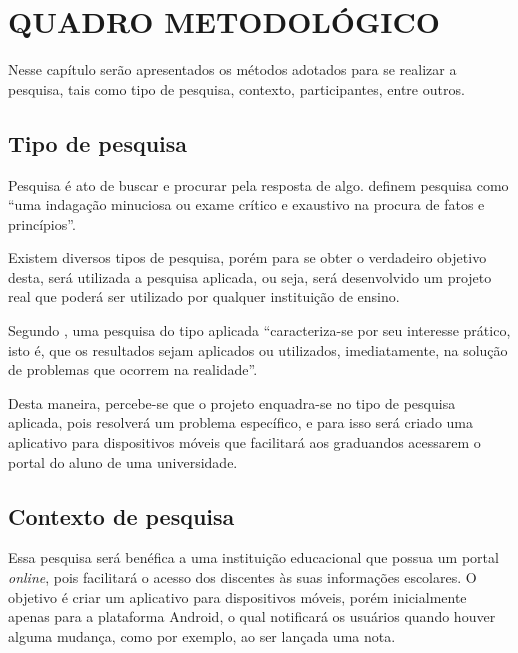 \chapter{QUADRO METODOLÓGICO}

	\par Nesse capítulo serão apresentados os métodos adotados para se realizar a
pesquisa, tais como tipo de pesquisa, contexto, participantes, entre outros.

\section{Tipo de pesquisa}

	\par Pesquisa é ato de buscar e procurar pela resposta de algo.
 definem pesquisa como “uma indagação minuciosa
ou exame crítico e exaustivo na procura de fatos e princípios”.

	\par Existem diversos tipos de pesquisa, porém para se obter o verdadeiro
objetivo desta, será utilizada a pesquisa aplicada, ou seja, será desenvolvido
um projeto real que poderá ser utilizado por qualquer instituição de ensino.

	\par Segundo , uma pesquisa do tipo aplicada
“caracteriza-se por seu interesse prático, isto é, que os resultados sejam
aplicados ou utilizados, imediatamente, na solução de problemas que ocorrem na
realidade”.

	\par Desta maneira, percebe-se que o projeto enquadra-se no tipo de pesquisa
aplicada, pois resolverá um problema específico, e para isso será criado uma
aplicativo para dispositivos móveis que facilitará aos graduandos acessarem o
portal do aluno de uma universidade.

\section{Contexto de pesquisa}

	\par Essa pesquisa será benéfica a uma instituição educacional que possua
um portal \textit{online}, pois facilitará o acesso dos discentes às suas
informações escolares. O objetivo é criar um aplicativo para dispositivos
móveis, porém inicialmente apenas para a plataforma Android, o qual notificará
os usuários quando houver alguma mudança, como por exemplo, ao ser lançada uma
nota.
	
